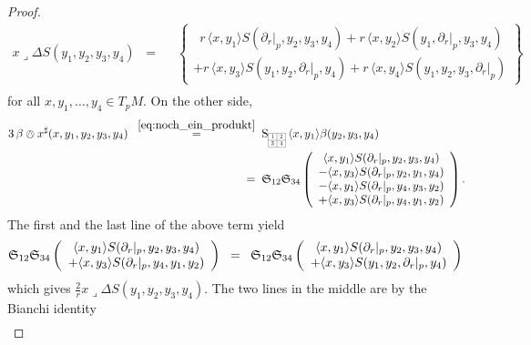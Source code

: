 \documentclass[11pt,a4paper]{article}
\theoremstyle{plain}
\theoremstyle{remark}
\newcommand{\cyclic}{\mathfrak{S}}
\newcommand{\rmS}{\mathrm{S}}
\begin{document}
\begin{proof}
\begin{align*}
x\lrcorner \Delta S(y_1,y_2,y_3,y_4)\;\;=\;\;&  \left \lbrace \begin{array}{c}\ \;r\, \langle x,y_1\rangle S(\partial_r|_p,y_2,y_3,y_4)
+ r\, \langle x,y_2\rangle S(y_1,\partial_r|_p,y_3,y_4)\\
+ r\, \langle x,y_3\rangle S(y_1,y_2,\partial_r|_p,y_4)
+ r\, \langle x,y_4\rangle S(y_1,y_2,y_3,\partial_r|_p)\end{array}\right \rbrace\\
\end{align*}
for all $x,y_1,\ldots,y_4\in T_pM$. On the other side,
\begin{align*}
3\,  \beta \owedge x^\sharp (x,y_1,y_2,y_3,y_4)\;\;\stackrel{\eqref{eq:noch_ein_produkt}}{=}\;\; &
\rmS_{\scaleto{\begin{array}{|c|c|}
\cline{1-2}
1 & 2 \\
\cline{1-2}
3 & 4 \\
\cline{1-2} 
\end{array}}{12pt}}\, \langle x, y_1 \rangle \beta (y_2,y_3,y_4) \\
\;\;=\;\; & \cyclic_{12}\cyclic_{34}\left ( \begin{array}{c}\langle x,y_1\rangle S(\partial_r|_p,y_2,y_3,y_4)  \\
- \langle x,y_3\rangle S(\partial_r|_p,y_2,y_1,y_4)\\
- \langle x,y_1\rangle S(\partial_r|_p,y_4,y_3,y_2)\\
+ \langle x,y_3\rangle S(\partial_r|_p,y_4,y_1,y_2)\end{array}\right ).
\end{align*}
The first and the last line of the above term yield
\begin{equation*}
\cyclic_{12}\cyclic_{34}\left ( \begin{array}{c}\langle x,y_1\rangle S(\partial_r|_p,y_2,y_3,y_4)  \\
+ \langle x,y_3\rangle S(\partial_r|_p,y_4,y_1,y_2)\end{array}\right ) \;\;=\;\;
\cyclic_{12}\cyclic_{34}\left ( \begin{array}{c}\langle x,y_1\rangle S(\partial_r|_p,y_2,y_3,y_4)  \\
+ \langle x,y_3\rangle S(y_1,y_2,\partial_r|_p,y_4)\end{array}\right )\\
\end{equation*}
which gives $\frac{2}{r}  x\lrcorner \Delta S(y_1,y_2,y_3,y_4)$. The two lines in the middle are by the Bianchi identity
\begin{align*}

\end{align*}
\end{proof}
\end{document}
